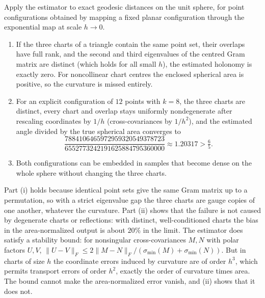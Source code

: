 \begin{theorem}
\label{thm:mds-obstruction}
Apply the estimator to exact geodesic distances on the unit sphere, for point configurations obtained by mapping a fixed planar configuration through the exponential map at scale $h\to0$.
\begin{enumerate}[label=(\roman*)]
\item If the three charts of a triangle contain the same point set, their overlaps have full rank, and the second and third eigenvalues of the centred Gram matrix are distinct (which holds for all small $h$), the estimated holonomy is exactly zero. For noncollinear chart centres the enclosed spherical area is positive, so the curvature is missed entirely.
\item For an explicit configuration of $12$ points with $k=8$, the three charts are distinct, every chart and overlap stays uniformly nondegenerate after rescaling coordinates by $1/h$ (cross-covariances by $1/h^2$), and the estimated angle divided by the true spherical area converges to
\begin{equation}
\frac{7884106465972959320549378723}{6552773242191625884795360000}\approx1.20317>\tfrac65 .
\end{equation}
\item Both configurations can be embedded in samples that become dense on the whole sphere without changing the three charts.
\end{enumerate}
\end{theorem}


Part (i) holds because identical point sets give the same Gram matrix up to a permutation, so with a strict eigenvalue gap the three charts are gauge copies of one another, whatever the curvature.
Part (ii) shows that the failure is not caused by degenerate charts or reflections: with distinct, well-conditioned charts the bias in the area-normalized output is about $20\%$ in the limit.
The estimator does satisfy a stability bound: for nonsingular cross-covariances $M,N$ with polar factors $U,V$,
$\|U-V\|_F\le2\|M-N\|_F/(\sigma_{\min}(M)+\sigma_{\min}(N))$.
But in charts of size $h$ the coordinate errors induced by curvature are of order $h^3$, which permits transport errors of order $h^2$, exactly the order of curvature times area.
The bound cannot make the area-normalized error vanish, and (ii) shows that it does not.

